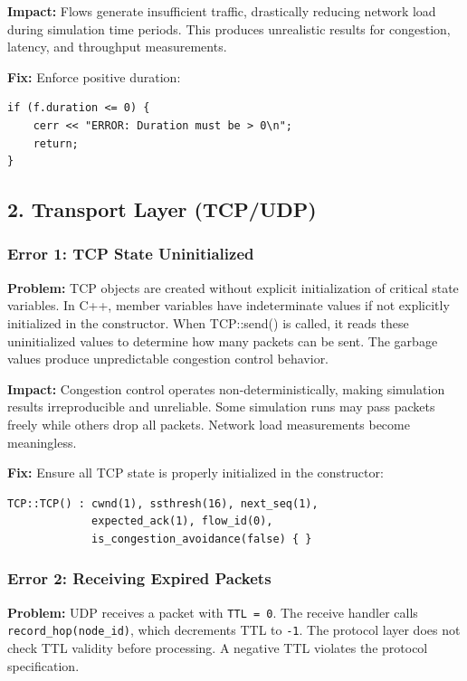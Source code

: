 \documentclass[11pt,a4paper]{article}
\begin{document}
\textbf{Impact:}
Flows generate insufficient traffic, drastically reducing network load during simulation time periods. This produces unrealistic results for congestion, latency, and throughput measurements.

\textbf{Fix:}
Enforce positive duration:
\begin{lstlisting}
if (f.duration <= 0) {
    cerr << "ERROR: Duration must be > 0\n";
    return;
}
\end{lstlisting}

\vspace{0.5cm}

\subsection{2. Transport Layer (TCP/UDP)}

\subsubsection{Error 1: TCP State Uninitialized}

\textbf{Problem:}
TCP objects are created without explicit initialization of critical state variables. In C++, member variables have indeterminate values if not explicitly initialized in the constructor. When TCP::send() is called, it reads these uninitialized values to determine how many packets can be sent. The garbage values produce unpredictable congestion control behavior.

\textbf{Impact:}
Congestion control operates non-deterministically, making simulation results irreproducible and unreliable. Some simulation runs may pass packets freely while others drop all packets. Network load measurements become meaningless.

\textbf{Fix:}
Ensure all TCP state is properly initialized in the constructor:
\begin{lstlisting}
TCP::TCP() : cwnd(1), ssthresh(16), next_seq(1), 
             expected_ack(1), flow_id(0), 
             is_congestion_avoidance(false) { }
\end{lstlisting}

\vspace{0.5cm}

\subsubsection{Error 2: Receiving Expired Packets}

\textbf{Problem:}
UDP receives a packet with \texttt{TTL = 0}. The receive handler calls \texttt{record\_hop(node\_id)}, which decrements TTL to \texttt{-1}. The protocol layer does not check TTL validity before processing. A negative TTL violates the protocol specification.
\end{document}
